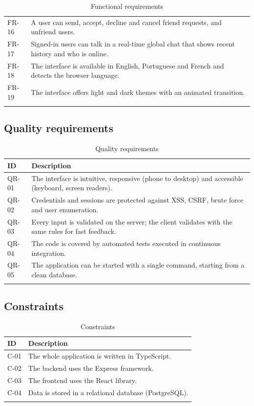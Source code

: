 \documentclass[11pt,a4paper]{article}
\begin{document}
\begin{longtable}{@{}lp{13cm}@{}}
FR-16 & A user can send, accept, decline and cancel friend requests, and unfriend users. \\
FR-17 & Signed-in users can talk in a real-time global chat that shows recent history and who is online. \\
FR-18 & The interface is available in English, Portuguese and French and detects the browser language. \\
FR-19 & The interface offers light and dark themes with an animated transition. \\
\bottomrule
\caption{Functional requirements}
\end{longtable}

\subsection{Quality requirements}

\begin{longtable}{@{}lp{13cm}@{}}
\toprule
\textbf{ID} & \textbf{Description} \\
\midrule
QR-01 & The interface is intuitive, responsive (phone to desktop) and accessible (keyboard, screen readers). \\
QR-02 & Credentials and sessions are protected against XSS, CSRF, brute force and user enumeration. \\
QR-03 & Every input is validated on the server; the client validates with the same rules for fast feedback. \\
QR-04 & The code is covered by automated tests executed in continuous integration. \\
QR-05 & The application can be started with a single command, starting from a clean database. \\
\bottomrule
\caption{Quality requirements}
\end{longtable}

\subsection{Constraints}

\begin{longtable}{@{}lp{13cm}@{}}
\toprule
\textbf{ID} & \textbf{Description} \\
\midrule
C-01 & The whole application is written in TypeScript. \\
C-02 & The backend uses the Express framework. \\
C-03 & The frontend uses the React library. \\
C-04 & Data is stored in a relational database (PostgreSQL). \\
\bottomrule
\caption{Constraints}
\end{longtable}
\end{document}
